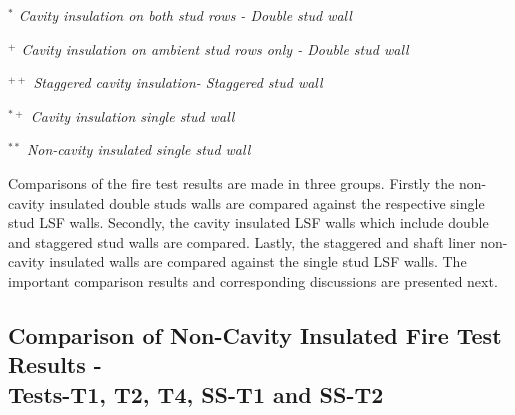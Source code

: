 \begin{sidewaystable}[!htbp]
\begin{threeparttable}
				\begin{tablenotes}
					\small
					\item \textit{\(^{*}\) Cavity insulation on both stud rows - Double stud wall}
					\item \textit{\(^{+}\) Cavity insulation on ambient stud rows only - Double stud wall}
					\item \textit{\(^{++}\) Staggered cavity insulation- Staggered stud wall}
					\item \textit{\(^{*+}\) Cavity insulation single stud wall}
					\item \textit{\(^{**}\) Non-cavity insulated single stud wall}
				\end{tablenotes}
	\end{threeparttable}
\end{sidewaystable}

Comparisons of the fire test results are made in three groups. Firstly the non-cavity insulated double studs walls are compared against the respective single stud LSF walls. Secondly, the cavity insulated LSF walls which include double and staggered stud walls are compared. Lastly, the staggered and shaft liner non-cavity insulated walls are compared against the single stud LSF walls. The important comparison results and corresponding discussions are presented next.

\subsection[Comparison of Non-Cavity Insulated Fire Test Results - Tests-T1, T2, T4, SS-T1 and SS-T2]{Comparison of Non-Cavity Insulated Fire Test Results - \\Tests-T1, T2, T4, SS-T1 and SS-T2}

